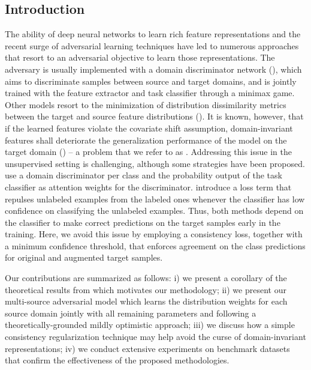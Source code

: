 \subsection{Introduction}
\label{sec:modafm_intro}
The ability of deep neural networks to learn rich feature representations and the recent surge of adversarial learning techniques have led to numerous approaches that resort to an adversarial objective to learn those representations. The adversary is usually implemented with a domain discriminator network (\citet{Ganin2015}), which aims to discriminate samples between source and target domains, and is jointly trained with the feature extractor and task classifier through a minimax game. Other models resort to the minimization of  distribution dissimilarity metrics between the target and source feature distributions (\citet{DeSIRe, Guo2018}). It is known, however, that if the learned features violate the covariate shift assumption, domain-invariant features shall deteriorate the generalization performance of the model on the target domain (\citet{Zhao2019}) -- a problem that we refer to as . Addressing this issue in the unsupervised setting is challenging, although some strategies have been proposed. \citet{Pei2018} use a domain discriminator per class and the probability output of the task classifier as attention weights for the discriminator. \citet{Sebag2019} introduce a loss term that repulses unlabeled examples from the labeled ones whenever the classifier has low confidence on classifying the unlabeled examples. Thus, both methods depend on the classifier to make correct predictions on the target samples early in the training. Here, we avoid this issue by employing a consistency loss, together with a minimum confidence threshold, that enforces agreement on the class predictions for original and augmented target samples.

Our contributions are summarized as follows: i) we present a corollary of the theoretical results from \citet{BenDavid2010} which motivates our methodology; ii) we present our multi-source adversarial model which learns the distribution weights for each source domain jointly with all remaining parameters and following a theoretically-grounded mildly optimistic approach; iii) we discuss how a simple consistency regularization technique may help avoid the curse of domain-invariant representations; iv) we conduct extensive experiments on benchmark datasets that confirm the effectiveness of the proposed methodologies.


